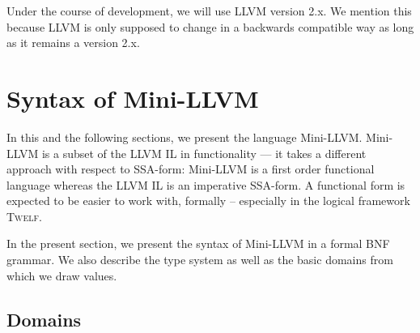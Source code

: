 \documentclass[a4paper, oneside, 10pt, draft]{memoir}
\newcommand{\twelf}{\textsc{Twelf}}
\begin{document}
Under the course of development, we will use LLVM version 2.x. We
mention this because LLVM is only supposed to change in a backwards
compatible way as long as it remains a version 2.x.

\chapter{Syntax of Mini-LLVM}

\newcommand{\variables}{\mathrm{Variables}}
\newcommand{\BBlabels}{\mathrm{Labels}}
\newcommand{\tnat}{\mathbf{nat}}
\newcommand{\tbool}{\mathbf{bool}}
\newcommand{\types}{\mathrm{Types}}
\newcommand{\typelist}{\mathrm{Type lists}}
\newcommand{\bbtype}{\mathrm{Label Type}}
\newcommand{\ftype}{\mathrm{Fun Contexts}}
\newcommand{\tpenv}{\mathrm{Var Contexts}}
\newcommand{\bbenv}{\mathrm{Label Contexts}}
\newcommand{\bor}{\; \vert \;}
\newcommand{\ntypes}{\tau_1 \times \tau_2 \times \dotsb \times \tau_n}
\newcommand{\ntypesp}{\tau'_1 \times \tau'_2 \times \dotsb \times
  \tau'_n}
\newcommand{\ntypespp}{\tau_1 \times \tau_2 \times \dotsb \times \tau_{n'}}
In this and the following sections, we present the language
Mini-LLVM. Mini-LLVM is a subset of the LLVM IL in functionality ---
it takes a different approach with respect to SSA-form: Mini-LLVM is a
first order functional language whereas the LLVM IL is an imperative
SSA-form. A functional form is expected to be easier to work with,
formally -- especially in the logical framework \twelf{}.

In the present section, we present the syntax of Mini-LLVM in a formal BNF
grammar. We also describe the type system as well as the basic domains
from which we draw values.

\section{Domains}
\end{document}
